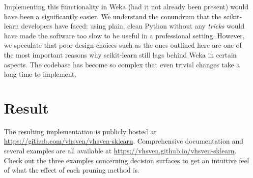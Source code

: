 Implementing this functionality in Weka (had it not already been present) would have been a significantly easier. We understand the conundrum that the scikit-learn developers have faced: using plain, clean Python without any \emph{tricks} would have made the software too slow to be useful in a professional setting. However, we speculate that poor design choices such as the ones outlined here are one of the most important reasons why scikit-learn still lags behind Weka in certain aspects. The codebase has become so complex that even trivial changes take a long time to implement.


\section{Result}
The resulting implementation is publicly hosted at \url{https://github.com/vhsven/vhsven-sklearn}. Comprehensive documentation and several examples are all available at \url{https://vhsven.github.io/vhsven-sklearn}. Check out the three examples concerning decision surfaces to get an intuitive feel of what the effect of each pruning method is.

